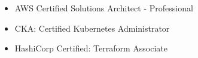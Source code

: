 \documentclass{resume}
\begin{document}



\begin{body}
	\begin{itemize}[noitemsep,topsep=0pt]
		\item AWS Certified Solutions Architect - Professional
		\item CKA: Certified Kubernetes Administrator
		\item HashiCorp Certified: Terraform Associate
	\end{itemize}
\end{body}


\end{document}
